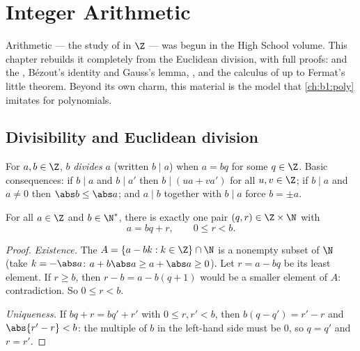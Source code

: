 \chapter{Integer Arithmetic}\label{ch:b1:arith}

Arithmetic --- the study of  in $\Z$ --- was begun in
the High School volume. This chapter rebuilds it completely from the
Euclidean division, with full proofs:  and the
, Bézout's identity and Gauss's lemma, , and the calculus of  up to Fermat's little
theorem. Beyond its own charm, this material is the model that
\cref{ch:b1:poly} imitates for polynomials.

\section{Divisibility and Euclidean division}

\begin{definition}[Divisibility]\label{def:b1:arith:divides}
For $a, b \in \Z$, $b$ \emph{divides} $a$ (written $b \mid
a$) when $a = bq$ for some $q \in \Z$. Basic
consequences: if $b \mid a$ and $b \mid a'$ then $b \mid (ua + va')$
for all $u, v \in \Z$; if $b \mid a$ and $a \neq 0$ then $\abs b \leq
\abs a$; and $a \mid b$ together with $b \mid a$ force $b = \pm a$.
\end{definition}

\begin{theorem}\label{thm:b1:arith:division}
For all $a \in \Z$ and $b \in \N^*$, there is exactly one pair $(q, r)
\in \Z \times \N$ with
\[
a = bq + r, \qquad 0 \leq r < b .
\]
\end{theorem}

\begin{proof}
\emph{Existence.} The  $A = \{a - bk : k \in \Z\} \cap \N$ is a
nonempty subset of $\N$ (take $k = -\abs a$: $a + b\abs a \geq a +
\abs a \geq 0$). Let $r = a - bq$ be its least element. If $r \geq b$,
then $r - b = a - b(q+1)$ would be a smaller element of $A$:
contradiction. So $0 \leq r < b$.

\emph{Uniqueness.} If $bq + r = bq' + r'$ with $0 \leq r, r' < b$,
then $b(q - q') = r' - r$ and $\abs{r' - r} < b$: the multiple of $b$
in the left-hand side must be $0$, so $q = q'$ and $r = r'$.
\end{proof}

